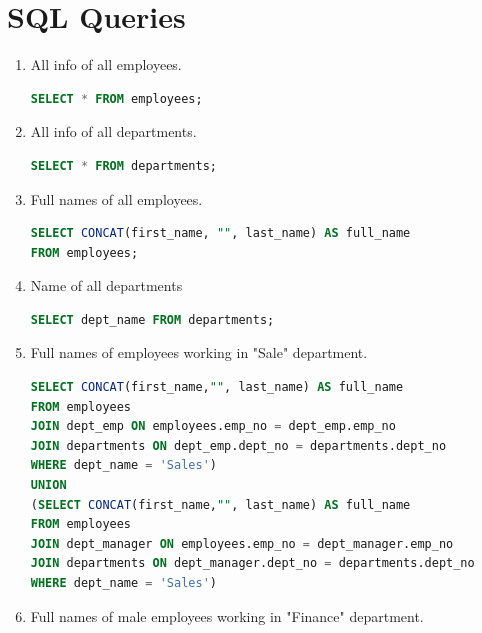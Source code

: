 \documentclass{article}
\begin{document}
\section*{SQL Queries}
\begin{enumerate}
	\item All info of all employees.\\
	
	\begin{lstlisting}[language=SQL]
SELECT * FROM employees;	
	\end{lstlisting}
	
	\item All info of all departments.\\
	
	\begin{lstlisting}[language=SQL]
SELECT * FROM departments;	
	\end{lstlisting}
	
	\item Full names of all employees.\\
	
	\begin{lstlisting}[language=SQL]
SELECT CONCAT(first_name, "", last_name) AS full_name
FROM employees;
	\end{lstlisting}
	
	\item Name of all departments\\
	
	\begin{lstlisting}[language=SQL]	
SELECT dept_name FROM departments;	
	\end{lstlisting}
	
	\item Full names of employees working in "Sale" department.\\
	
	\begin{lstlisting}[language=SQL]	
SELECT CONCAT(first_name,"", last_name) AS full_name
FROM employees
JOIN dept_emp ON employees.emp_no = dept_emp.emp_no
JOIN departments ON dept_emp.dept_no = departments.dept_no
WHERE dept_name = 'Sales')
UNION
(SELECT CONCAT(first_name,"", last_name) AS full_name
FROM employees
JOIN dept_manager ON employees.emp_no = dept_manager.emp_no
JOIN departments ON dept_manager.dept_no = departments.dept_no
WHERE dept_name = 'Sales')
	\end{lstlisting}	
	
	\item Full names of male employees working in "Finance" department.\\
	

\end{enumerate}
\end{document}

